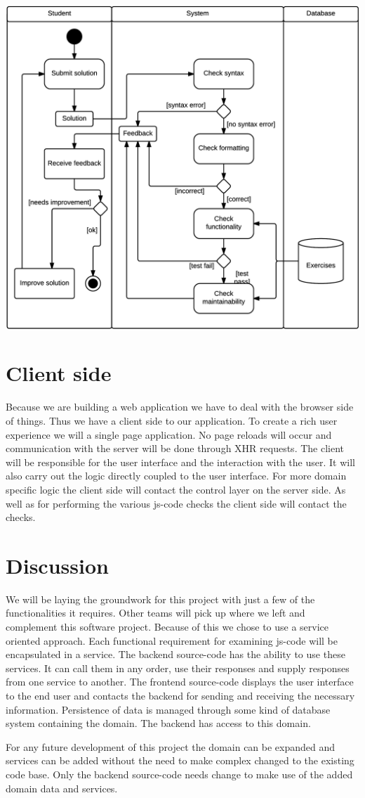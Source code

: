 \includegraphics[scale=0.75]{diagrams-images/code-submission-activity-diagram}

\section{Client side}
Because we are building a web application
we have to deal with the browser side of things.
Thus we have a client side to our application.
To create a rich user experience we will a single page application.
No page reloads will occur
and communication with the server will be done through XHR requests.
The client will be responsible for the user interface
and the interaction with the user.
It will also carry out the logic directly coupled to the user interface.
For more domain specific logic
the client side will contact the control layer on the server side.
As well as for performing the various \gls{js-code} checks
the client side will contact the checks.

\section{Discussion}
We will be laying the groundwork for this project
with just a few of the functionalities it requires.
Other teams will pick up where we left and complement this software project.
Because of this we chose to use a service oriented approach.
Each functional requirement for examining \gls{js-code}
will be encapsulated in a service.
The backend \gls{source-code} has the ability to use these services.
It can call them in any order, use their responses
and supply responses from one service to another.
The frontend \gls{source-code} displays the user interface to the end user
and contacts the backend for sending and receiving the necessary information.
Persistence of data is managed through some kind of database system
containing the domain.
The backend has access to this domain.

For any future development of this project
the domain can be expanded
and services can be added
without the need to make complex changed to the existing code base.
Only the backend \gls{source-code} needs change
to make use of the added domain data and services.

